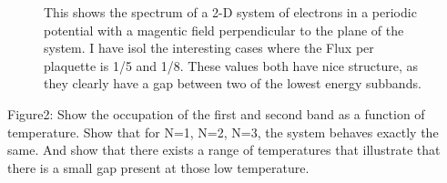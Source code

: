 \documentclass[12pt]{article}
\begin{document}
\begin{figure}[H]%
 	\centering
          \caption{This shows the spectrum of a 2-D system of electrons in a periodic
		  potential with a magentic field perpendicular to the plane of the system. I have isol
		  the interesting cases where the Flux per plaquette is 1/5 and 1/8. These
		  values both have nice structure, as they clearly have a gap between two of
		  the lowest energy subbands.} 
          \label{intial spectrum}
\end{figure}


Figure2:
Show the occupation of the first and second band as a function of temperature.
Show that for N=1, N=2, N=3, the system behaves exactly the same. And show that
there exists a range of temperatures that illustrate that there is a small gap present at
those low temperature.
\end{document}
